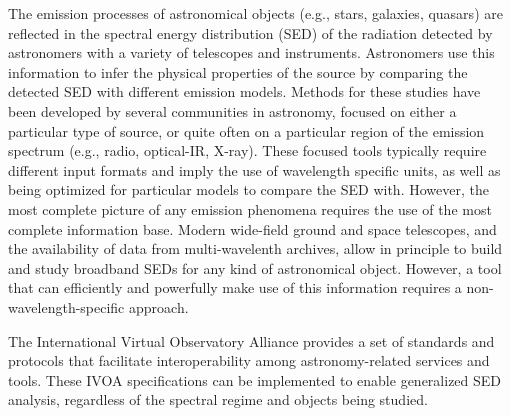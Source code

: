 \documentclass[preprint,authoryear,5p]{elsarticle}
\begin{document}
The emission processes of astronomical objects (e.g., stars, galaxies, quasars)
are reflected in the spectral energy distribution (SED) of the radiation detected
by astronomers with a variety of telescopes and instruments. Astronomers use this
information to infer the physical properties of the source by comparing the
detected SED with different emission models. Methods for these studies have
been developed by several communities in astronomy, focused on either a particular
type of source, or quite often on a particular region of the emission spectrum
(e.g., radio, optical-IR, X-ray). These focused tools typically require different
input formats and imply the use of wavelength specific units, as well as being
optimized for particular models to compare the SED with. However, the most
complete picture of any emission phenomena requires the use of the most complete
information base. Modern wide-field ground and space telescopes, and the
availability of data from multi-wavelenth archives, allow in principle to build
and study broadband SEDs for any kind of astronomical object. However, a tool that can
efficiently and powerfully make use of this information requires a 
non-wavelength-specific approach.

\begin{sloppypar}
The International Virtual
Observatory Alliance \citep[IVOA;][]{2004SPIE.5493..137Q} provides a set of
standards and protocols that facilitate interoperability among astronomy-related
services and tools. These IVOA specifications can be implemented to enable
generalized SED analysis, regardless of the spectral regime
and objects being studied.
\end{sloppypar}
\end{document}
